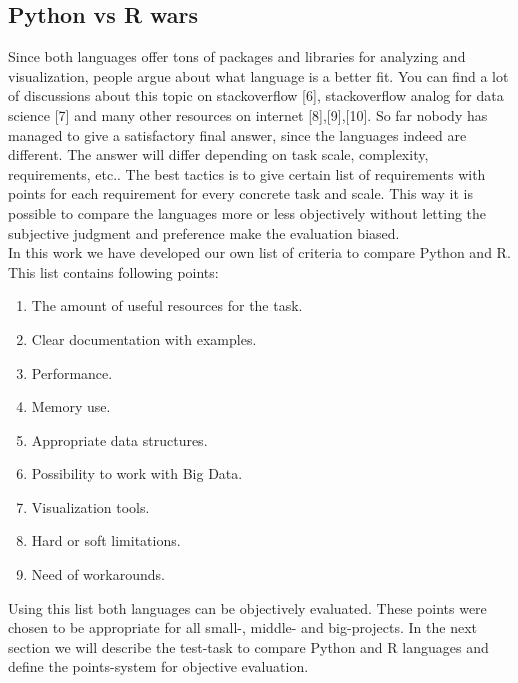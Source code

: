 \documentclass{article}
\begin{document}
\subsection{Python vs R wars}
Since both languages offer tons of packages and libraries for analyzing and visualization, people argue about what language is a better fit. You can find a lot of discussions about this topic on stackoverflow [6], stackoverflow analog for data science [7] and many other resources on internet [8],[9],[10].
So far nobody has managed to give a satisfactory final answer, since the languages indeed are different. The answer will differ depending on task scale, complexity, requirements, etc.. The best tactics is to give certain list of requirements with points for each requirement for every concrete task and scale. This way it is possible to compare the languages more or less objectively without letting the subjective judgment and preference make the evaluation biased.\\
In this work we have developed our own list of criteria to compare Python and R. This list contains following points:
\begin{enumerate}
    \item The amount of useful resources for the task.
    \item Clear documentation with examples.
    \item Performance.
    \item Memory use.
    \item Appropriate data structures.
    \item Possibility to work with Big Data.
    \item Visualization tools.
    \item Hard or soft limitations.
    \item Need of workarounds.
\end{enumerate}
Using this list both languages can be objectively evaluated. These points were chosen to be appropriate for all small-, middle- and big-projects. In the next section we will describe the test-task to compare Python and R languages and define the points-system for objective evaluation.\\
\end{document}
